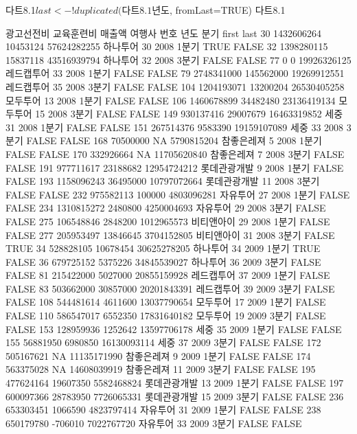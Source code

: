 \documentclass[tutorial.tex]{subfiles}
\begin{document}
\begin{Schunk}
\begin{Soutput}
다트8.1$last <- !duplicated(다트8.1$년도, fromLast=TRUE)
다트8.1

    광고선전비 교육훈련비      매출액       여행사 번호 년도  분기 first  last
30  1432606264   10453124 57624282255     하나투어   30 2008 1분기  TRUE FALSE
32  1398280115   15837118 43516939794     하나투어   32 2008 3분기 FALSE FALSE
77           0          0 19926326125   레드캡투어   33 2008 1분기 FALSE FALSE
79  2748341000  145562000 19269912551   레드캡투어   35 2008 3분기 FALSE FALSE
104 1204193071   13200204 26530405258     모두투어   13 2008 1분기 FALSE FALSE
106 1460678899   34482480 23136419134     모두투어   15 2008 3분기 FALSE FALSE
149  930137416   29007679 16463319852         세중   31 2008 1분기 FALSE FALSE
151  267514376    9583390 19159107089         세중   33 2008 3분기 FALSE FALSE
168   70500000         NA  5790815204   참좋은레져    5 2008 1분기 FALSE FALSE
170  332926664         NA 11705620840   참좋은레져    7 2008 3분기 FALSE FALSE
191  977711617   23188682 12954724212 롯데관광개발    9 2008 1분기 FALSE FALSE
193 1158096243   36495000 10797072664 롯데관광개발   11 2008 3분기 FALSE FALSE
232  975582113     100000  4803096281     자유투어   27 2008 1분기 FALSE FALSE
234 1310815272    2480800  4250004693     자유투어   29 2008 3분기 FALSE FALSE
275  106548846    2848200  1012965573   비티앤아이   29 2008 1분기 FALSE FALSE
277  205953497   13846645  3704152805   비티앤아이   31 2008 3분기 FALSE  TRUE
34   528828105   10678454 30625278205     하나투어   34 2009 1분기  TRUE FALSE
36   679725152    5375226 34845539027     하나투어   36 2009 3분기 FALSE FALSE
81   215422000    5027000 20855159928   레드캡투어   37 2009 1분기 FALSE FALSE
83   503662000   30857000 20201843391   레드캡투어   39 2009 3분기 FALSE FALSE
108  544481614    4611600 13037790654     모두투어   17 2009 1분기 FALSE FALSE
110  586547017    6552350 17831640182     모두투어   19 2009 3분기 FALSE FALSE
153  128959936    1252642 13597706178         세중   35 2009 1분기 FALSE FALSE
155   56881950    6980850 16130093114         세중   37 2009 3분기 FALSE FALSE
172  505167621         NA 11135171990   참좋은레져    9 2009 1분기 FALSE FALSE
174  563375028         NA 14608039919   참좋은레져   11 2009 3분기 FALSE FALSE
195  477624164   19607350  5582468824 롯데관광개발   13 2009 1분기 FALSE FALSE
197  600097366   28783950  7726065331 롯데관광개발   15 2009 3분기 FALSE FALSE
236  653303451    1066590  4823797414     자유투어   31 2009 1분기 FALSE FALSE
238  650179780    -706010  7022767720     자유투어   33 2009 3분기 FALSE FALSE

\end{Soutput}
\end{Schunk}
\end{document}
